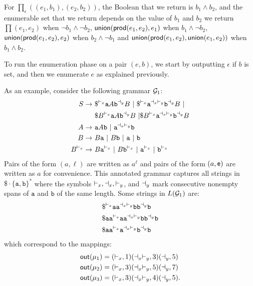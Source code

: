 For
$\prod_\epsilon( (e_1,b_1), (e_2,b_2))$, the Boolean that we return is $b_1
\land b_2$, and the enumerable set that we return depends on the value of
$b_1$ and $b_2$ we return $\prod(e_1,e_2)$ when $\lnot b_1\land \lnot
b_2$, $\mathsf{union}(\mathsf{prod}(e_1,e_2),e_1)$ when $b_1\land \lnot b_2$,
$\mathsf{union}(\mathsf{prod}(e_1,e_2),e_2)$ when $b_2 \land \lnot b_1$ and
$\mathsf{union}(\mathsf{prod}(e_1,e_2),\mathsf{union}(e_1,e_2))$ when $b_1\land b_2$. 

To run the enumeration phase on a pair $(e,b)$, we start by outputting $\epsilon$ if $b$ is
set, and then we enumerate $e$ as explained previously.

%

%
%
%
%
%
%
%
%
%
%
%
%
%
%
%
%
%
%
%
%
%
%
%
%
%
%
%
%
%
%
%
%
%
%
%
%
%
%
%
%
%
%
%
%
%
%
%
%
%
%
%
%
%
%
%
%
%
%
%
%
%
%
%
%
%
%
%
%
%
%
%
%
%
%
%
%
%
%
%
%
%
%
%
%
%
%
%
%
%
%
%
%
%
%
%
%
%
%
%
%
%
%
%
%
%
%
%
%
%
%
%
%
%
%
%
%
%
%
%
%
%
%
%

As an example, consider the following grammar $\mathcal{G}_1$:
\begin{align*}
	S \to \ &\$^{\op{x}} \texttt{a} A \texttt{b}^{\cl{y}} B \ | \ \$^{\op{x}} \texttt{a}^{\cl{x}\op{y}} \texttt{b}^{\cl{y}} B \ | \\
	&\$ B^{\op{x}} \texttt{a} A \texttt{b}^{\cl{y}} B \ | \$ B^{\op{x}} \texttt{a}^{\cl{x}\op{y}} \texttt{b}^{\cl{y}} B \\
	A \to \ &\texttt{a} A \texttt{b} \ | \ \texttt{a}^{\cl{x}\op{y}}\texttt{b} \\
	B \to \  &B\texttt{a} \ | \ B\texttt{b} \ | \ \texttt{a} \ | \ \texttt{b}\\
	B^{\op{x}} \to \ &B\texttt{a}^{\op{x}} \ | \ B\texttt{b}^{\op{x}} \ | \ \texttt{a}^{\op{x}} \ | \ \texttt{b}^{\op{x}}
\end{align*}
Pairs of the form $(a, \ell)$ are written as $a^{\ell}$ and pairs of the form $(a, \mathsf{e})$ are written as $a$ for convenience. This annotated grammar captures all strings in $\$ \cdot \{\texttt{a}, \texttt{b}\}^*$ where the symbols $\vdash_{x}, \dashv_{x}, \vdash_{y}$, and $\dashv_{y}$ mark consecutive nonempty spans of $\texttt{a}$ and $\texttt{b}$ of the same length. 
Some strings in $L(\mathcal{G}_1)$ are:
\begin{align*}
	&\$^{\vdash_{x}}\texttt{a} \texttt{a}^{\dashv_{x}\vdash_{y}} \texttt{b} \texttt{b}^{\dashv_{y}} \texttt{b}\\
	&\$\texttt{a} \texttt{a}^{\vdash_{x}} \texttt{a} \texttt{a}^{\dashv_{x}\vdash_{y}} \texttt{b} \texttt{b}^{\dashv_{y}} \texttt{b}\\
	&\$\texttt{a} \texttt{a}^{\vdash_{x}} \texttt{a}^{\dashv_{x}\vdash_{y}}\texttt{b}^{\dashv_{y}} \texttt{b}
\end{align*}
which correspond to the mappings:
\begin{align*}
	\textsf{out}(\mu_1) &= (\vdash_{x}, 1)(\dashv_{x}\vdash_{y}, 3)(\dashv_{y}, 5) \\
	\textsf{out}(\mu_2) &= (\vdash_{x}, 3)(\dashv_{x}\vdash_{y}, 5)(\dashv_{y}, 7) \\
	\textsf{out}(\mu_3) &= (\vdash_{x}, 3)(\dashv_{x}\vdash_{y}, 4)(\dashv_{y}, 5)  .
\end{align*}

